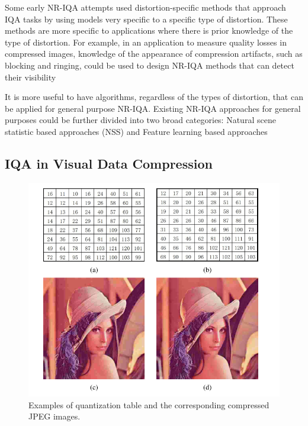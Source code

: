 Some early NR-IQA attempts used distortion-specific methods that approach IQA tasks by using models very specific to a specific type of distortion. These methods are more specific to applications where there is prior knowledge of the type of distortion. For example, in an application to measure quality losses in compressed images, knowledge of the appearance of compression artifacts, such as blocking and ringing, could be used to design NR-IQA methods that can detect their visibility 

It is more useful to have algorithms, regardless of the types of distortion, that can be applied for general purpose NR-IQA. Existing NR-IQA approaches for general purposes could be further divided into two broad categories: Natural scene statistic based approaches (NSS) and Feature learning based approaches


\subsection{IQA in Visual Data Compression}

\begin{figure}[H]
  \includegraphics[width=\linewidth]{figures/jpeg.png}
  \captionsetup{justification=raggedright}
  \caption{Examples of quantization table and the corresponding compressed
JPEG images.} 
  \label{fig:jpeg}

\end{figure}

